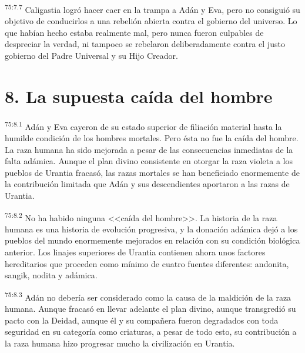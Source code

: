 \par
\textsuperscript{75:7.7} Caligastia logró hacer caer en la trampa a Adán y Eva, pero no consiguió su objetivo de conducirlos a una rebelión abierta contra el gobierno del universo. Lo que habían hecho estaba realmente mal, pero nunca fueron culpables de despreciar la verdad, ni tampoco se rebelaron deliberadamente contra el justo gobierno del Padre Universal y su Hijo Creador.

\section*{8. La supuesta caída del hombre}
\par
\textsuperscript{75:8.1} Adán y Eva cayeron de su estado superior de filiación material hasta la humilde condición de los hombres mortales. Pero ésta no fue la caída del hombre. La raza humana ha sido mejorada a pesar de las consecuencias inmediatas de la falta adámica. Aunque el plan divino consistente en otorgar la raza violeta a los pueblos de Urantia fracasó, las razas mortales se han beneficiado enormemente de la contribución limitada que Adán y sus descendientes aportaron a las razas de Urantia.

\par
\textsuperscript{75:8.2} No ha habido ninguna <<caída del hombre>>. La historia de la raza humana es una historia de evolución progresiva, y la donación adámica dejó a los pueblos del mundo enormemente mejorados en relación con su condición biológica anterior. Los linajes superiores de Urantia contienen ahora unos factores hereditarios que proceden como mínimo de cuatro fuentes diferentes: andonita, sangik, nodita y adámica.

\par
\textsuperscript{75:8.3} Adán no debería ser considerado como la causa de la maldición de la raza humana. Aunque fracasó en llevar adelante el plan divino, aunque transgredió su pacto con la Deidad, aunque él y su compañera fueron degradados con toda seguridad en su categoría como criaturas, a pesar de todo esto, su contribución a la raza humana hizo progresar mucho la civilización en Urantia.

